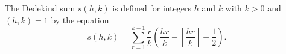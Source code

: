The Dedekind sum $s(h, k)$ is defined for integers $h$ and $k$ with $k > 0$ and $(h, k) = 1$ by the equation
$$s(h, k) = \sum_{r=1}^{k-1} \frac{r}{k} \left( \frac{hr}{k} - \left[ \frac{hr}{k} \right] - \frac{1}{2} \right).$$
